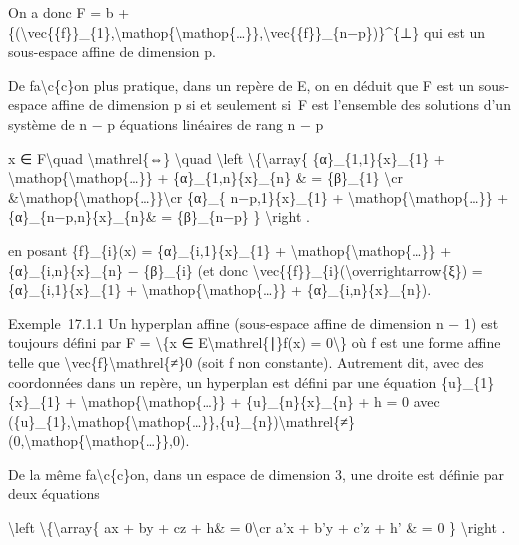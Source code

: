\documentclass[]{article}
\begin{document}
On a donc F = b +
\{(\textbackslash{}vec\{\{f\}\}\_\{1\},\textbackslash{}mathop\{\textbackslash{}mathop\{\ldots{}\}\},\textbackslash{}vec\{\{f\}\}\_\{n−p\})\}\^{}\{⊥\}
qui est un sous-espace affine de dimension p.

De fa\textbackslash{}c\{c\}on plus pratique, dans un repère de E, on en
déduit que F est un sous-espace affine de dimension p si et seulement
si~F est l'ensemble des solutions d'un système de n − p équations
linéaires de rang n − p

x ∈ F\textbackslash{}quad \textbackslash{}mathrel\{⇔\}
\textbackslash{}quad \textbackslash{}left
\textbackslash{}\{\textbackslash{}array\{ \{α\}\_\{1,1\}\{x\}\_\{1\} +
\textbackslash{}mathop\{\textbackslash{}mathop\{\ldots{}\}\} +
\{α\}\_\{1,n\}\{x\}\_\{n\} \& = \{β\}\_\{1\} \textbackslash{}cr
\&\textbackslash{}mathop\{\textbackslash{}mathop\{\ldots{}\}\}\textbackslash{}cr
\{α\}\_\{ n−p,1\}\{x\}\_\{1\} +
\textbackslash{}mathop\{\textbackslash{}mathop\{\ldots{}\}\} +
\{α\}\_\{n−p,n\}\{x\}\_\{n\}\& = \{β\}\_\{n−p\} \} \textbackslash{}right
.

en posant \{f\}\_\{i\}(x) = \{α\}\_\{i,1\}\{x\}\_\{1\} +
\textbackslash{}mathop\{\textbackslash{}mathop\{\ldots{}\}\} +
\{α\}\_\{i,n\}\{x\}\_\{n\} − \{β\}\_\{i\} (et donc
\textbackslash{}vec\{\{f\}\}\_\{i\}(\textbackslash{}overrightarrow\{ξ\})
= \{α\}\_\{i,1\}\{x\}\_\{1\} +
\textbackslash{}mathop\{\textbackslash{}mathop\{\ldots{}\}\} +
\{α\}\_\{i,n\}\{x\}\_\{n\}).

Exemple~17.1.1 Un hyperplan affine (sous-espace affine de dimension n −
1) est toujours défini par F = \textbackslash{}\{x ∈
E\textbackslash{}mathrel\{∣\}f(x) = 0\textbackslash{}\} où f est une
forme affine telle que
\textbackslash{}vec\{f\}\textbackslash{}mathrel\{≠\}0 (soit f non
constante). Autrement dit, avec des coordonnées dans un repère, un
hyperplan est défini par une équation \{u\}\_\{1\}\{x\}\_\{1\} +
\textbackslash{}mathop\{\textbackslash{}mathop\{\ldots{}\}\} +
\{u\}\_\{n\}\{x\}\_\{n\} + h = 0 avec
(\{u\}\_\{1\},\textbackslash{}mathop\{\textbackslash{}mathop\{\ldots{}\}\},\{u\}\_\{n\})\textbackslash{}mathrel\{≠\}(0,\textbackslash{}mathop\{\textbackslash{}mathop\{\ldots{}\}\},0).

De la même fa\textbackslash{}c\{c\}on, dans un espace de dimension 3,
une droite est définie par deux équations

\textbackslash{}left \textbackslash{}\{\textbackslash{}array\{ ax + by +
cz + h\& = 0\textbackslash{}cr a'x + b'y + c'z + h' \& = 0 \}
\textbackslash{}right .
\end{document}
